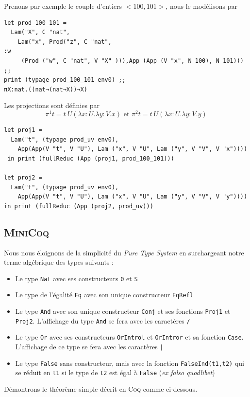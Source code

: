Prenons par exemple le couple d'entiers $<100, 101>$, nous le modélisons par 
\begin{verbatim}
let prod_100_101 = 
  Lam("X", C "nat", 
    Lam("x", Prod("z", C "nat", 
:w
     (Prod ("w", C "nat", V "X" ))),App (App (V "x", N 100), N 101))) ;;
print (typage prod_100_101 env0) ;;
πX:nat.((nat→(nat→X))→X)  
\end{verbatim}

Les projections sont définies par 
$$\pi^1 t = t\ U (\lambda x:U.\lambda y:V. x) \text{  et  } \pi^2 t = t\ U (\lambda x:U.\lambda y:V. y)$$
\begin{verbatim}
let proj1 = 
  Lam("t", (typage prod_uv env0), 
    App(App(V "t", V "U"), Lam ("x", V "U", Lam ("y", V "V", V "x"))))
 in print (fullReduc (App (proj1, prod_100_101)))

let proj2 = 
  Lam("t", (typage prod_uv env0),
    App(App(V "t", V "U"), Lam ("x", V "U", Lam ("y", V "V", V "y"))))
in print (fullReduc (App (proj2, prod_uv)))
\end{verbatim}

\subsection{\textsc{MiniCoq}}
Nous  nous éloignons de la simplicité du \textit{Pure Type System} en surchargeant notre
 terme algébrique des types suivants :
\begin{itemize}
  \item Le type \texttt{Nat} avec ses constructeurs \texttt{0} et \texttt{S}
  \item Le type de l'égalité \texttt{Eq} avec son unique constructeur \texttt{EqRefl}
  \item Le type \texttt{And} avec son unique constructeur \texttt{Conj} et ses fonctions
  \texttt{Proj1} et \texttt{Proj2}. L'affichage du type \texttt{And} se fera avec les caractères \verb+/+
  \item Le type \texttt{Or} avec ses constructeurs \texttt{OrIntrol} et \texttt{OrIntror} et sa fonction \texttt{Case}.
  L'affichage de ce type se fera avec les caractères \verb+|+
  \item Le type \texttt{False} sans constructeur, mais avec la fonction \texttt{FalseInd(t1,t2)} qui se
  réduit en \texttt{t1} si le type de \texttt{t2} est égal à \texttt{False}  (\textit{ex falso quodlibet})
\end{itemize}

\vspace{0.2cm}
Démontrons le théorème simple décrit en \textsc{Coq} comme ci-dessous.


